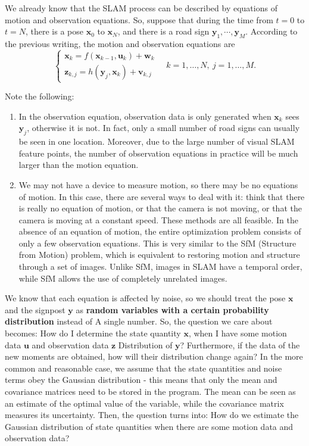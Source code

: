 We already know that the SLAM process can be described by equations of motion and observation equations. So, suppose that during the time from $t=0$ to $t=N$, there is a pose $\bm{x}_0$ to $\bm{x}_N$, and there is a road sign $\bm{y}_1 , \cdots, \bm{y}_M$. According to the previous writing, the motion and observation equations are
\begin{equation}
\left\{ \begin{array}{l}
{\bm{x}_k} = f\left( {{\bm{x}_{k - 1}},{\bm{u}_k}} \right) + \bm{w}_k \\
{\bm{z}_{k,j}} = h\left( {{ \bm{y}_j},{ \bm{x}_k}}  \right)+ \bm{v}_{k,j}
   \end{array} \right. \quad k=1, \ldots, N, \  j=1, \ldots, M.
\end{equation}

Note the following:

\begin{enumerate}
    \item In the observation equation, observation data is only generated when $\bm{x}_k$ sees $\bm{y}_j$, otherwise it is not. In fact, only a small number of road signs can usually be seen in one location. Moreover, due to the large number of visual SLAM feature points, the number of observation equations in practice will be much larger than the motion equation.
    \item We may not have a device to measure motion, so there may be no equations of motion. In this case, there are several ways to deal with it: think that there is really no equation of motion, or that the camera is not moving, or that the camera is moving at a constant speed. These methods are all feasible. In the absence of an equation of motion, the entire optimization problem consists of only a few observation equations. This is very similar to the SfM (Structure from Motion) problem, which is equivalent to restoring motion and structure through a set of images. Unlike SfM, images in SLAM have a temporal order, while SfM allows the use of completely unrelated images.
\end{enumerate}

We know that each equation is affected by noise, so we should treat the pose $\bm{x}$ and the signpost $\bm{y}$ as \textbf{random variables with a certain probability distribution} instead of A single number. So, the question we care about becomes: How do I determine the state quantity $\bm{x}$, when I have some motion data $\bm{u}$ and observation data $\bm{z}$ Distribution of $\bm{y}$? Furthermore, if the data of the new moments are obtained, how will their distribution change again? In the more common and reasonable case, we assume that the state quantities and noise terms obey the Gaussian distribution - this means that only the mean and covariance matrices need to be stored in the program. The mean can be seen as an estimate of the optimal value of the variable, while the covariance matrix measures its uncertainty. Then, the question turns into: How do we estimate the Gaussian distribution of state quantities when there are some motion data and observation data?


